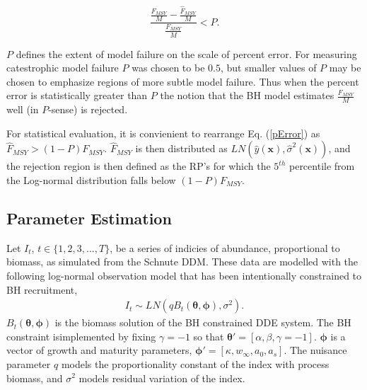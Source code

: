 %
\begin{equation}
\frac{\frac{F_{MSY}}{M}-\frac{\hat{F}_{MSY}}{M}}{\frac{F_{MSY}}{M}}<P. \label{pError}
\end{equation}

%
$P$ defines the extent of model failure on the scale of percent error. For
measuring catestrophic model failure $P$ was chosen to be $0.5$, but smaller values
of $P$ may be chosen to emphasize regions of more subtle model failure. %
%
Thus when the percent error is statistically greater than $P$ the notion that
the BH model estimates $\frac{F_{MSY}}{M}$ well (in $P$-sense) is rejected.

%
For statistical evaluation, it is convienient to rearrange Eq. (\ref{pError})
as \mbox{$\hat{F}_{MSY}>(1-P)F_{MSY}$}. $\hat{F}_{MSY}$ is then distributed as $LN(\hat y(\textbf{x}), \hat \sigma^2(\textbf{x}))$,
and the rejection region is then defined as the RP's for which the $5^{th}$ percentile
from the Log-normal distribution falls below \mbox{$(1-P)F_{MSY}$.}



%
\subsection{Parameter Estimation}

%
Let $I_t$, $t\in\{1,2,3,...,T\}$, be a series of indicies of abundance, 
proportional to biomass, as simulated from the Schnute DDM. These data 
are modelled with the following log-normal observation model that has been 
intentionally constrained to BH recruitment, 
%
\begin{align}
I_t \sim LN(q B_t(\bm{\theta}, \bm{\phi}), \sigma^2). \label{bL}
\end{align}
%
$B_t(\bm{\theta}, \bm{\phi})$ is the biomass solution of the BH constrained DDE system. %
The BH constraint isimplemented by fixing $\gamma=-1$ so that $\bm{\theta}'=[\alpha, \beta, \gamma=-1]$. 
$\bm{\phi}$ is a vector of growth and maturity parameters, 
$\bm{\phi}'=[\kappa, w_\infty, a_0, a_s]$. The nuisance parameter $q$ models 
the proportionality constant of the index with process biomass, and $\sigma^2$ 
models residual variation of the index.

